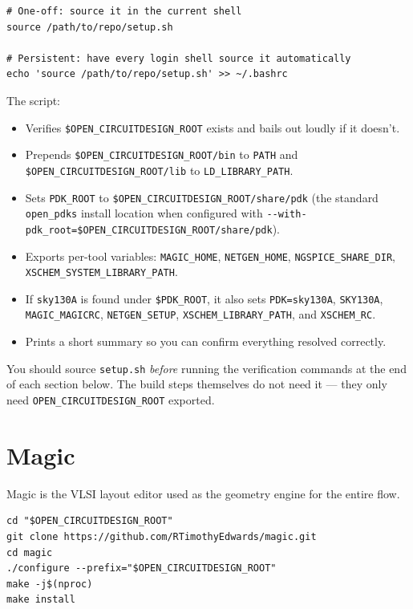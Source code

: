 \documentclass[11pt]{article}
\begin{document}
\begin{lstlisting}
# One-off: source it in the current shell
source /path/to/repo/setup.sh

# Persistent: have every login shell source it automatically
echo 'source /path/to/repo/setup.sh' >> ~/.bashrc
\end{lstlisting}

\noindent The script:

\begin{itemize}[leftmargin=2em]
  \item Verifies \texttt{\$OPEN\_CIRCUITDESIGN\_ROOT} exists and bails out
        loudly if it doesn't.
  \item Prepends \texttt{\$OPEN\_CIRCUITDESIGN\_ROOT/bin} to \texttt{PATH}
        and \texttt{\$OPEN\_CIRCUITDESIGN\_ROOT/lib} to
        \texttt{LD\_LIBRARY\_PATH}.
  \item Sets \texttt{PDK\_ROOT} to
        \texttt{\$OPEN\_CIRCUITDESIGN\_ROOT/share/pdk} (the standard
        \texttt{open\_pdks} install location when configured with
        \texttt{-{}-with-pdk\_root=\$OPEN\_CIRCUITDESIGN\_ROOT/share/pdk}).
  \item Exports per-tool variables: \texttt{MAGIC\_HOME}, \texttt{NETGEN\_HOME},
        \texttt{NGSPICE\_SHARE\_DIR}, \texttt{XSCHEM\_SYSTEM\_LIBRARY\_PATH}.
  \item If \texttt{sky130A} is found under \texttt{\$PDK\_ROOT}, it also
        sets \texttt{PDK=sky130A}, \texttt{SKY130A},
        \texttt{MAGIC\_MAGICRC}, \texttt{NETGEN\_SETUP},
        \texttt{XSCHEM\_LIBRARY\_PATH}, and \texttt{XSCHEM\_RC}.
  \item Prints a short summary so you can confirm everything resolved
        correctly.
\end{itemize}

You should source \texttt{setup.sh} \emph{before} running the verification
commands at the end of each section below. The build steps themselves do
not need it --- they only need \texttt{OPEN\_CIRCUITDESIGN\_ROOT} exported.

\section{Magic}

Magic is the VLSI layout editor used as the geometry engine for the entire flow.

\begin{lstlisting}
cd "$OPEN_CIRCUITDESIGN_ROOT"
git clone https://github.com/RTimothyEdwards/magic.git
cd magic
./configure --prefix="$OPEN_CIRCUITDESIGN_ROOT"
make -j$(nproc)
make install
\end{lstlisting}
\end{document}

